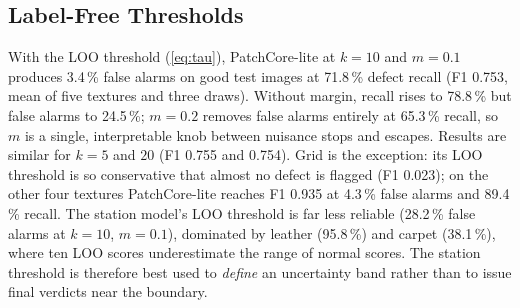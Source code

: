 \subsection{Label-Free Thresholds}\label{sec:res-threshold}
With the LOO threshold (\ref{eq:tau}), PatchCore-lite at $k=10$ and $m=0.1$ produces 3.4\,\% false alarms on good test images at 71.8\,\% defect recall (F1 0.753, mean of five textures and three draws). Without margin, recall rises to 78.8\,\% but false alarms to 24.5\,\%; $m=0.2$ removes false alarms entirely at 65.3\,\% recall, so $m$ is a single, interpretable knob between nuisance stops and escapes. Results are similar for $k=5$ and $20$ (F1 0.755 and 0.754). Grid is the exception: its LOO threshold is so conservative that almost no defect is flagged (F1 0.023); on the other four textures PatchCore-lite reaches F1 0.935 at 4.3\,\% false alarms and 89.4\,\% recall. The station model's LOO threshold is far less reliable (28.2\,\% false alarms at $k=10$, $m=0.1$), dominated by leather (95.8\,\%) and carpet (38.1\,\%), where ten LOO scores underestimate the range of normal scores. The station threshold is therefore best used to \emph{define} an uncertainty band rather than to issue final verdicts near the boundary.
